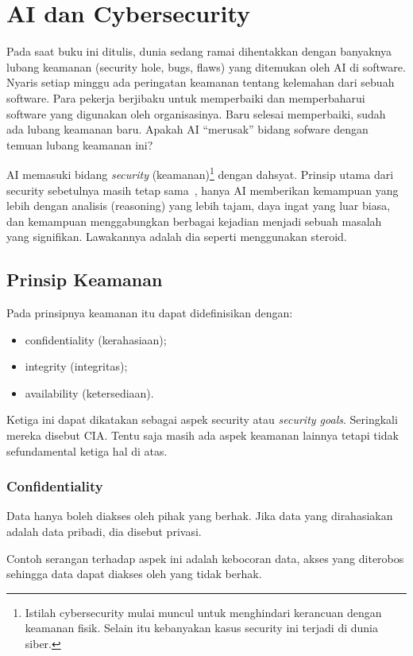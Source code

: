 \chapter{AI dan Cybersecurity}

Pada saat buku ini ditulis, dunia sedang ramai dihentakkan dengan
banyaknya lubang keamanan (security hole, bugs, flaws) yang ditemukan
oleh AI di software.
Nyaris setiap minggu ada peringatan keamanan tentang kelemahan
dari sebuah software.
Para pekerja berjibaku untuk memperbaiki dan memperbaharui software
yang digunakan oleh organisasinya.
Baru selesai memperbaiki, sudah ada lubang keamanan baru.
Apakah AI ``merusak'' bidang sofware dengan temuan lubang keamanan ini?

AI memasuki bidang \emph{security} (keamanan)\footnote{Istilah cybersecurity
mulai muncul untuk menghindari kerancuan dengan keamanan fisik.
Selain itu kebanyakan kasus security ini terjadi di dunia siber.}
dengan dahsyat.
Prinsip utama dari security sebetulnya masih tetap sama~\cite{rahardjo1999}, 
hanya AI memberikan kemampuan yang lebih dengan analisis (reasoning) 
yang lebih tajam, daya ingat yang luar biasa,
dan kemampuan menggabungkan berbagai kejadian menjadi sebuah
masalah yang signifikan.
Lawakannya adalah dia seperti menggunakan steroid.

\section{Prinsip Keamanan}
Pada prinsipnya keamanan itu dapat didefinisikan dengan:
\begin{itemize}
\item confidentiality (kerahasiaan);
\item integrity (integritas);
\item availability (ketersediaan).
\end{itemize}
Ketiga ini dapat dikatakan sebagai aspek security
atau \emph{security goals}. Seringkali mereka disebut CIA.
Tentu saja masih ada aspek keamanan lainnya tetapi tidak sefundamental
ketiga hal di atas.

\subsection{Confidentiality}
Data hanya boleh diakses oleh pihak yang berhak.
Jika data yang dirahasiakan adalah data pribadi, dia disebut privasi.

Contoh serangan terhadap aspek ini adalah
kebocoran data, akses yang diterobos sehingga data dapat diakses
oleh yang tidak berhak.


